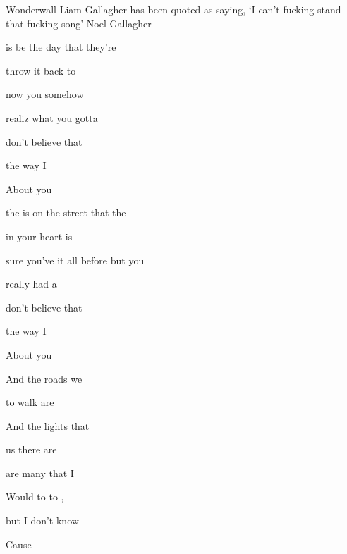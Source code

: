 \begin{SBSong}{Wonderwall}
  {Liam Gallagher has been quoted as saying, `I can't fucking stand that fucking song'}
  {Noel Gallagher}
  \begin{SBVerse}
     is  be the day that they're 
    
     throw it back to 
    
     now you  somehow 
    
    realiz what you gotta 
    
     don't believe that 
    
     the way I 
    
    About you   
  \end{SBVerse}
  \begin{SBVerse}
     the  is on the street that the 
    
     in your heart is 
    
     sure you've  it all before but you 
    
     really had a 
    
     don't believe that 
    
     the way I 
    
    About you   
  \end{SBVerse}
  \begin{SBVerse}
    And  the roads we 
    
     to walk are 
    
    And  the lights that 
    
     us there are 
    
     are many  that I 
    
    Would  to  to , 
    
    but I don't know 
  \end{SBVerse}
  \CBPageBrk
  \begin{SBVerse}
    Cause    
    

\end{SBVerse}
\end{SBSong}
